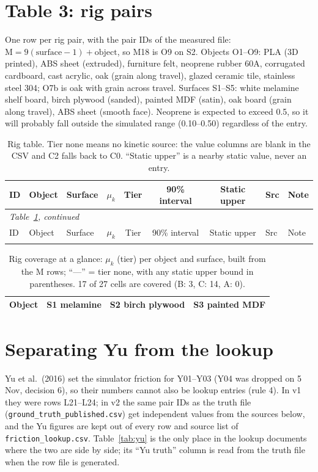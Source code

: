 \documentclass[11pt]{article}
\begin{document}
\section{Table 3: rig pairs}\label{sec:rig}
One row per rig pair, with the pair IDs of the measured file: $\mathrm{M} = 9(\text{surface}-1) + \text{object}$, so M18 is O9 on S2. Objects O1--O9: PLA (3D printed), ABS sheet (extruded), furniture felt, neoprene rubber 60A, corrugated cardboard, cast acrylic, oak (grain along travel), glazed ceramic tile, stainless steel 304; O7b is oak with grain across travel. Surfaces S1--S5: white melamine shelf board, birch plywood (sanded), painted MDF (satin), oak board (grain along travel), ABS sheet (smooth face). Neoprene is expected to exceed 0.5, so it will probably fall outside the simulated range (0.10--0.50) regardless of the entry.

{\footnotesize
\begin{longtable}{l p{2.3cm} p{2.4cm} r c c c l p{3.9cm}}
\caption{Rig table. Tier none means no kinetic source: the value columns are blank in the CSV and C2 falls back to C0. ``Static upper'' is a nearby static value, never an entry.}\label{tab:rig}\\
\hline
ID & Object & Surface & $\mu_k$ & Tier & 90\% interval & Static upper & Src & Note\\
\hline
\endfirsthead
\multicolumn{9}{l}{\emph{Table~\ref{tab:rig}, continued}}\\
\hline
ID & Object & Surface & $\mu_k$ & Tier & 90\% interval & Static upper & Src & Note\\
\hline
\endhead
\hline
\endfoot

\end{longtable}
}

\begin{table}[htbp]
\centering\small
\caption{Rig coverage at a glance: $\mu_k$ (tier) per object and surface, built from the M rows; ``---'' = tier none, with any static upper bound in parentheses. 17 of 27 cells are covered (B: 3, C: 14, A: 0).}\label{tab:grid}
\begin{tabular}{l l l l}
\hline
Object & S1 melamine & S2 birch plywood & S3 painted MDF\\
\hline

\hline
\end{tabular}
\end{table}

\section{Separating Yu from the lookup}\label{sec:yu}
Yu et al.\ (2016) set the simulator friction for Y01--Y03 (Y04 was dropped on 5 Nov, decision 6), so their numbers cannot also be lookup entries (rule 4). In v1 they were rows L21--L24; in v2 the same pair IDs as the truth file (\texttt{ground\_truth\_published.csv}) get independent values from the sources below, and the Yu figures are kept out of every row and source list of \texttt{friction\_lookup.csv}. Table~\ref{tab:yu} is the only place in the lookup documents where the two are side by side; its ``Yu truth'' column is read from the truth file when the row file is generated.
\end{document}
